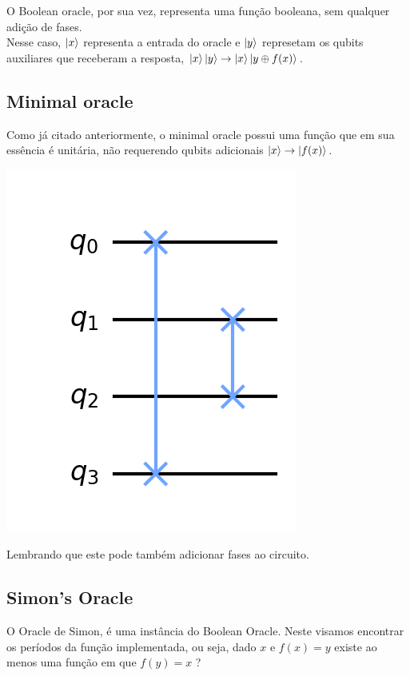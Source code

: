 \documentclass{article}
\begin{document}
O Boolean oracle, por sua vez, representa uma função booleana, sem qualquer adição de fases.\\
Nesse caso, $\mathinner{|{x}\rangle}$ representa a entrada do oracle e $\mathinner{|{y}\rangle}$ represetam os qubits auxiliares que receberam a resposta, $\mathinner{|{x}\rangle}\mathinner{|{y}\rangle} \to \mathinner{|{x}\rangle}\mathinner{|{y \oplus f(x)}\rangle}$.

\subsection{Minimal oracle}

Como já citado anteriormente, o minimal oracle possui uma função que em sua essência é unitária, não requerendo qubits adicionais $\mathinner{|{x}\rangle} \to \mathinner{|{f(x)}\rangle}$.

\begin{center}
	\includegraphics[scale=0.3]{minimal-oracle.png}
	\label{fig:minimal-oracle}
\end{center}

Lembrando que este pode também adicionar fases ao circuito.

\subsection{Simon's Oracle}

O Oracle de Simon, é uma instância do Boolean Oracle. Neste visamos encontrar os períodos da função implementada, ou seja, dado $x$ e $f(x) = y$ existe ao menos uma função em que $f(y) = x$ ?
\end{document}
